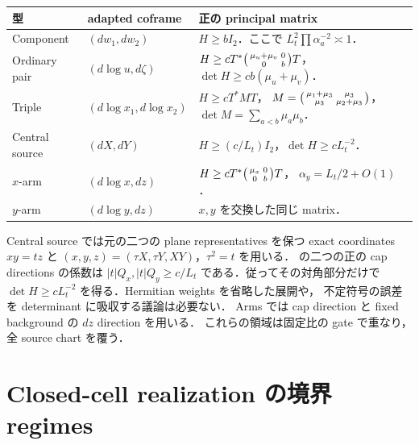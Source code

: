 \documentclass[a4paper,11pt]{ltjsarticle}
\numberwithin{equation}{section}
\theoremstyle{plain}
\theoremstyle{definition}
\theoremstyle{remark}
\begin{document}
\begin{center}
\small
\begin{tabularx}{\textwidth}{@{}p{}p{}X@{}}
\toprule
型 & adapted coframe & 正の principal matrix \\
\midrule
Component
 & $(dw_1,dw_2)$
 & $H\ge bI_2$．ここで $L_t^2\prod\alpha_a^{-2}\asymp1$．\\[1mm]
Ordinary pair
 & $(d\log u,d\zeta)$
 & $H\ge cT^*\begin{psmallmatrix}\mu_u+\mu_v&0\\0&b\end{psmallmatrix}T$，
 $\det H\ge cb(\mu_u+\mu_v)$．\\[1mm]
Triple
 & $(d\log x_1,d\log x_2)$
 & $H\ge cT^*MT$，
 $M=\begin{psmallmatrix}\mu_1+\mu_3&\mu_3\\\mu_3&\mu_2+\mu_3\end{psmallmatrix}$，
 $\det M=\sum_{a<b}\mu_a\mu_b$．\\[1mm]
Central source
 & $(dX,dY)$
 & $H\ge (c/L_t)I_2$，$\det H\ge cL_t^{-2}$．\\[1mm]
$x$-arm
 & $(d\log x,dz)$
 & $H\ge cT^*\begin{psmallmatrix}\mu_x&0\\0&b\end{psmallmatrix}T$，
 $\alpha_y=L_t/2+O(1)$．\\[1mm]
$y$-arm
 & $(d\log y,dz)$
 & $x,y$ を交換した同じ matrix．\\
\bottomrule
\end{tabularx}
\end{center}

Central source では元の二つの plane representatives を保つ exact coordinates
$xy=tz$ と $(x,y,z)=(\tau X,\tau Y,XY)$，$\tau^2=t$ を用いる．
 の二つの正の cap directions の係数は
$|t|Q_x,|t|Q_y\ge c/L_t$ である．従ってその対角部分だけで
$\det H\ge cL_t^{-2}$ を得る．Hermitian weights を省略した展開や，
不定符号の誤差を determinant に吸収する議論は必要ない．
Arms では cap direction と fixed background の $dz$ direction を用いる．
これらの領域は固定比の gate で重なり，全 source chart を覆う．

\section{Closed-cell realization の境界 regimes}\label{coarse:app:closed-cell-regimes}
\end{document}
